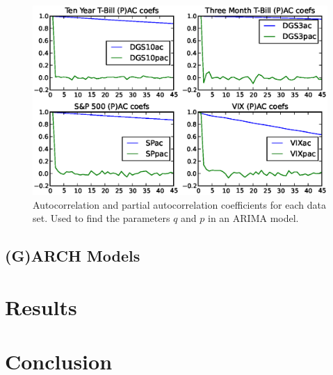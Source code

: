 \documentclass[a4paper, 11pt]{article}
\theoremstyle{definition} %
\numberwithin{equation}{section}
\begin{document}
    \begin{figure}[ht]
        \centering
        \includegraphics[width=6in]{./Figures/all_corrs.eps}
        \caption{\small Autocorrelation and partial autocorrelation coefficients for each data set. Used to find the parameters $q$ and $p$ in an ARIMA model.}
        \label{fig:correlations}
    \end{figure}


  \subsection{(G)ARCH Models} \label{sub:garch}

\section{Results} \label{sec:results}

\section{Conclusion} \label{sec:conclusion}

\newpage


\end{document}
